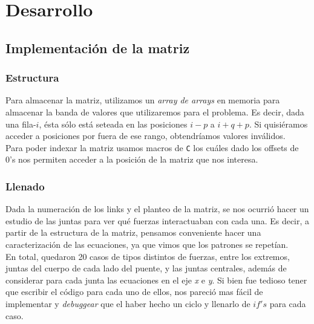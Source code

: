 \section{Desarrollo}

\subsection{Implementación de la matriz}

\subsubsection{Estructura}
\label{subsec:estructura}
Para almacenar la matriz, utilizamos un \textit{array de arrays} en memoria para almacenar la banda de valores que utilizaremos para el problema. Es decir, dada una fila-$i$, ésta sólo está seteada en las posiciones $i - p$ a $i + q + p$. Si quisiéramos acceder a posiciones por fuera de ese rango, obtendríamos valores inválidos.\\

Para poder indexar la matriz usamos macros de \verb|C| los cuáles dado los offsets de 0's nos permiten acceder a la posición de la matriz que nos interesa.

\subsubsection{Llenado}

Dada la numeración de los links y el planteo de la matriz, se nos ocurrió hacer un estudio de las juntas para ver qué fuerzas interactuaban con cada una. Es decir, a partir de la estructura de la matriz, pensamos conveniente hacer una caracterización de las ecuaciones, ya que vimos que los patrones se repetían.\\

En total, quedaron  20 casos de tipos distintos de fuerzas, entre los extremos, juntas del cuerpo de cada lado del puente, y las juntas centrales, además de considerar para cada junta las ecuaciones en el eje \textit{x} e \textit{y}. Si bien fue tedioso tener que escribir el código para cada uno de ellos, nos pareció mas fácil de implementar y \textit{debuggear} que el haber hecho un ciclo y llenarlo de $if's$ para cada caso.

